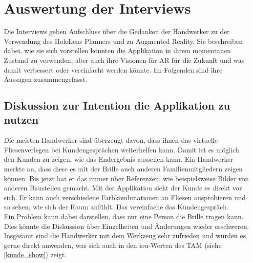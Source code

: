 \section{Auswertung der Interviews}

Die Interviews geben Aufschluss über die Gedanken der Handwerker zu der Verwendung des HoloLens Planners und zu Augmented Reality. Sie beschreiben dabei, wie sie sich vorstellen könnten die Applikation in ihrem momentanen Zustand zu verwenden, aber auch ihre Visionen für AR für die Zukunft und was damit verbessert oder vereinfacht werden könnte. Im Folgenden sind ihre Aussagen zusammengefasst.

\subsection{Diskussion zur Intention die Applikation zu nutzen}

Die meisten Handwerker sind überzeugt davon, dass ihnen das virtuelle Fliesenverlegen bei Kundengesprächen weiterhelfen kann. Damit ist es möglich den Kunden zu zeigen, wie das Endergebnis aussehen kann. Ein Handwerker merkte an, dass diese es mit der Brille auch anderen Familienmitgliedern zeigen können. Bis jetzt hat er das immer über Referenzen, wie beispielsweise Bilder von anderen Baustellen gemacht. Mit der Applikation sieht der Kunde es direkt vor sich. Er kann auch verschiedene Farbkombinationen an Fliesen ausprobieren und so sehen, wie sich der Raum anfühlt. Das vereinfache das Kundengespräch. \\
Ein Problem kann dabei darstellen, dass nur eine Person die Brille tragen kann. Dies könnte die Diskussion über Einzelheiten und Änderungen wieder erschweren. Insgesamt sind die Handwerker mit dem Werkzeug sehr zufrieden und würden es gerne direkt anwenden, was sich auch in den iou-Werten des TAM (siehe \ref{kunde_show}) zeigt.

